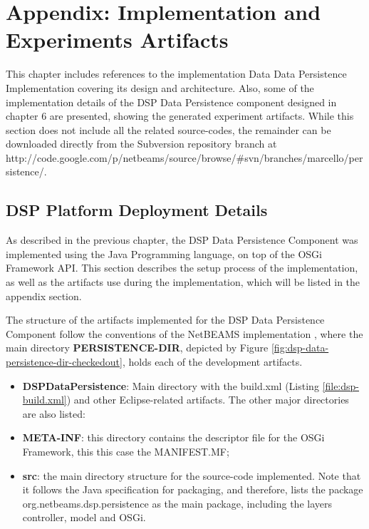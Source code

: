 \chapter{Appendix: Implementation and Experiments Artifacts}

This chapter includes references to the implementation Data Data Persistence
Implementation covering its design and architecture. Also, some of the
implementation details of the DSP Data Persistence component designed in
chapter 6 are presented, showing the generated experiment artifacts. While
this section does not include all the related source-codes, the remainder can
be downloaded directly from the Subversion repository branch at
http://code.google.com/p/netbeams/source/browse/\#svn/branches/marcello/persistence/.

\section{DSP Platform Deployment Details}
\label{sec:dsp-data-persistence-implementation}

As described in the previous chapter, the DSP Data Persistence Component was
implemented using the Java Programming language, on top of the OSGi Framework
API. This section describes the setup process of the implementation, as well
as the artifacts use during the implementation, which will be listed in the
appendix section.

The structure of the artifacts implemented for the DSP Data Persistence
Component follow the conventions of the NetBEAMS implementation
\cite{netbeams-dsp-architecture}, where the main directory
\textbf{PERSISTENCE-DIR}, depicted by Figure
\ref{fig:dsp-data-persistence-dir-checkedout}, holds each of the development
artifacts.

\begin{itemize}
  \item \textbf{DSPDataPersistence}: Main directory with the build.xml (Listing
  \ref{file:dsp-build.xml}) and other Eclipse-related artifacts. The other
  major directories are also listed:
  \item \textbf{META-INF}: this directory contains the descriptor file for
  the OSGi Framework, this this case the MANIFEST.MF;
  \item \textbf{src}: the main directory structure for the source-code
  implemented. Note that it follows the Java specification for packaging, and
  therefore, lists the package org.netbeams.dsp.persistence as the main
  package, including the layers controller, model and OSGi.
\end{itemize}

